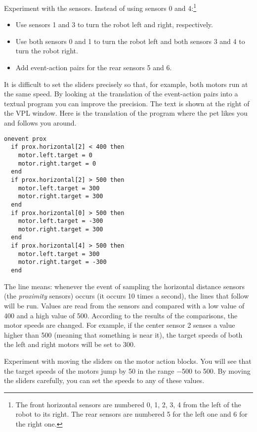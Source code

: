 
Experiment with the sensors. Instead of using sensors 0 and
4:\footnote{The front horizontal sensors are numbered 0, 1, 2, 3, 4 from
the left of the robot to its right. The rear sensors are numbered 5 for
the left one and 6 for the right one.}

\begin{itemize}
\item Use sensors 1 and 3 to turn the robot left and right,
respectively.
\item Use both sensors 0 and 1 to turn the robot left and both sensors 3
and 4 to turn the robot right.
\item Add event-action pairs for the rear sensors 5 and 6.
\end{itemize}


It is difficult to set the sliders precisely so that, for example, both
motors run at the same speed. By looking at the translation of the
event-action pairs into a textual program you can improve the precision.
The text is shown at the right of the VPL window.
Here is the translation of the program where the
pet likes you and follows you around.

\begin{small}
\begin{verbatim}
onevent prox
  if prox.horizontal[2] < 400 then
    motor.left.target = 0
    motor.right.target = 0
  end
  if prox.horizontal[2] > 500 then
    motor.left.target = 300
    motor.right.target = 300
  end
  if prox.horizontal[0] > 500 then
    motor.left.target = -300
    motor.right.target = 300
  end
  if prox.horizontal[4] > 500 then
    motor.left.target = 300
    motor.right.target = -300
  end
\end{verbatim}
\end{small}

The line  means: whenever the event of sampling the
horizontal distance sensors (the \emph{proximity} sensors) occurs (it
occurs 10 times a second), the lines that follow will be run. Values are
read from the sensors and compared with a low value of 400 and a high
value of 500. According to the results of the comparisons, the motor
speeds are changed. For example, if the center sensor 2 senses a value
higher than 500 (meaning that something is near it), the target speeds
of both the left and right motors will be set to 300.

Experiment with moving the sliders on the motor action blocks. You will
see that the target speeds of the motors jump by 50 in the range $-$500
to 500. By moving the sliders carefully, you can set the speeds to any
of these values.
